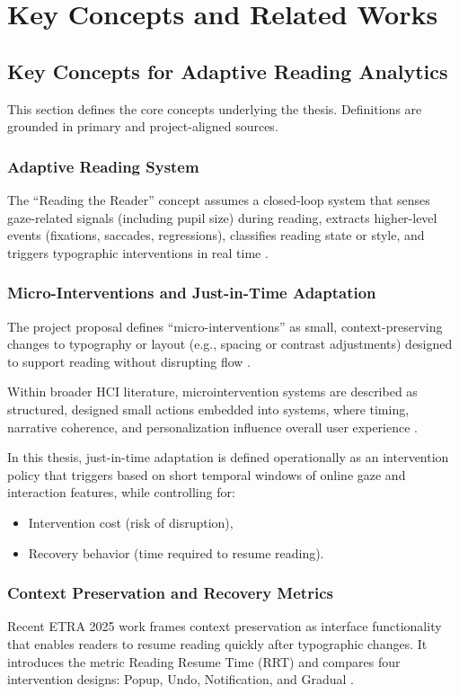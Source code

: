 \section{Key Concepts and Related Works}

\subsection{Key Concepts for Adaptive Reading Analytics}
This section defines the core concepts underlying the thesis. Definitions are grounded in primary and project-aligned sources.

\subsubsection{Adaptive Reading System}
The “Reading the Reader” concept assumes a closed-loop system that senses gaze-related signals (including pupil size) during reading, extracts higher-level events (fixations, saccades, regressions), classifies reading state or style, and triggers typographic interventions in real time \cite{ref1}.

\subsubsection{Micro-Interventions and Just-in-Time Adaptation}
The project proposal defines “micro-interventions” as small, context-preserving changes to typography or layout (e.g., spacing or contrast adjustments) designed to support reading without disrupting flow \cite{ref2}.  

Within broader HCI literature, microintervention systems are described as structured, designed small actions embedded into systems, where timing, narrative coherence, and personalization influence overall user experience \cite{ref2}.  

In this thesis, just-in-time adaptation is defined operationally as an intervention policy that triggers based on short temporal windows of online gaze and interaction features, while controlling for:
\begin{itemize}
    \item Intervention cost (risk of disruption),
    \item Recovery behavior (time required to resume reading).
\end{itemize}

\subsubsection{Context Preservation and Recovery Metrics}
Recent ETRA 2025 work frames context preservation as interface functionality that enables readers to resume reading quickly after typographic changes. It introduces the metric Reading Resume Time (RRT) and compares four intervention designs: Popup, Undo, Notification, and Gradual \cite{ref2}.  

